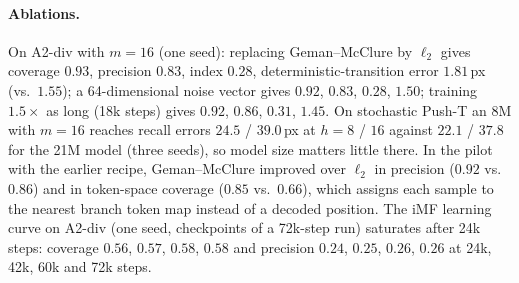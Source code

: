 \paragraph{Ablations.}
\label{app:ablation}
On A2-div with $m{=}16$ (one seed): replacing Geman--McClure by $\ell_2$ gives coverage $0.93$, precision $0.83$, index $0.28$, deterministic-transition error $1.81$\,px (vs.\ $1.55$); a 64-dimensional noise vector gives $0.92$, $0.83$, $0.28$, $1.50$; training $1.5\times$ as long (18k steps) gives $0.92$, $0.86$, $0.31$, $1.45$. On stochastic Push-T an 8M \imlewm{} with $m{=}16$ reaches recall errors $24.5$ / $39.0$\,px at $h = 8$ / $16$ against $22.1$ / $37.8$ for the 21M model (three seeds), so model size matters little there. In the pilot with the earlier recipe, Geman--McClure improved over $\ell_2$ in precision ($0.92$ vs.\ $0.86$) and in token-space coverage ($0.85$ vs.\ $0.66$), which assigns each sample to the nearest branch token map instead of a decoded position. The iMF learning curve on A2-div (one seed, checkpoints of a 72k-step run) saturates after 24k steps: coverage $0.56$, $0.57$, $0.58$, $0.58$ and precision $0.24$, $0.25$, $0.26$, $0.26$ at 24k, 42k, 60k and 72k steps.

\FloatBarrier
